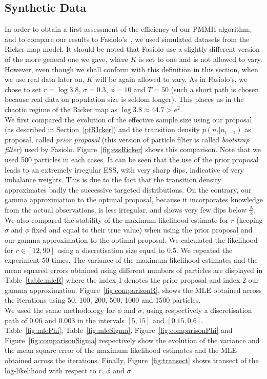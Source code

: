 \documentclass[12pt]{article}
\begin{document}
	
	\subsection{Synthetic Data}
	In order to obtain a first assessment of the efficiency of our PMMH algorithm, and to compare our results to Fasiolo's~\cite{fasiolo2014statistical}, we used simulated datasets from the Ricker map model. It should be noted that Fasiolo use a slightly different version of the more general one we gave, where $K$ is set to one and is not allowed to vary. However, even though we shall conform with this definition in this section, when we use real data later on, $K$ will be again allowed to vary. As in Fasiolo's, we chose to set $r=\log 3.8$, $\sigma=0.3$, $\phi=10$ and $T=50$ (such a short path is chosen because real data on population size is seldom longer). This places us in the  chaotic regime of the Ricker map as $\log 3.8 \approx 44.7 > e^2$. \\
	
	We first compared the evolution of the effective sample size using our proposal (as described in Section~\ref{pfRIcker}) and the transition density $p(n_t|n_{t-1})$ as proposal, called \emph{prior proposal} (this version of particle filter is called \emph{bootstrap filter}) used by Fasiolo. Figure~\ref{fig:essRicker} shows this comparison. Note that we used 500 particles in each cases. It can be seen that the use of the prior proposal leads to an extremely irregular ESS, with very sharp dips, indicative of very imbalance weights. This is due to the fact that the transition density approximates badly the successive targeted distributions. On the contrary, our gamma approximation to the optimal proposal, because it incorporates knowledge from the actual observations, is less irregular, and shows very few dips below $\frac{N}{2}$. \\
	
	We also compared the stability of the maximum likelihood estimate for $r$ (keeping $\sigma$ and $\phi$ fixed and equal to their true value) when using the prior proposal and our gamma approximation to the optimal proposal. We calculated the likelihood for $r \in [12, 90]$ using a discretisation size equal to 0.5. We repeated the experiment 50 times. The variance of the maximum likelihood estimates and the mean squared errors obtained using different numbers of particles are displayed in Table~\ref{table:mleR} where the index 1 denotes the prior proposal and index 2 our gamma approximation. Figure~\ref{fig:comparisonR}, shows the MLE obtained across the iterations using 50, 100, 200, 500, 1000 and 1500 particles. \\
	We used the same methodology for $\phi$ and $\sigma$, using respectively a discretisation path of 0.06 and 0.003 in the intervals $[5, 15]$ and $[0.15, 0.6]$. Table~\ref{fig:mlePhi}, Table~\ref{fig:mleSigma}, Figure~\ref{fig:comparisonPhi} and Figure~\ref{fig:comparisonSigma} respectively show the evolution of the variance and the mean square error of the maximum likelihood estimates and the MLE obtained across the iterations. Finally, Figure~\ref{fig:transect} shows transect of the log-likelihood with respect to $r$, $\phi$ and $\sigma$. 
	
\end{document}
